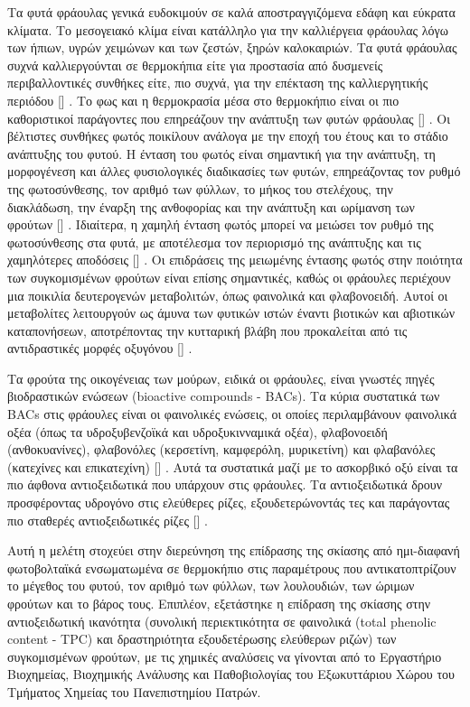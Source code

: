 \documentclass[12pt, a4paper]{report} %
\DeclareRobustCommand{\lcitep}[1]{%
  \english{[\cite{#1}]}%
}
\newcommand{\english}{\foreignlanguage{english}}
\begin{document}
Τα φυτά φράουλας γενικά ευδοκιμούν σε καλά αποστραγγιζόμενα εδάφη και εύκρατα κλίματα. Το μεσογειακό κλίμα είναι 
κατάλληλο για την καλλιέργεια φράουλας λόγω των ήπιων, υγρών χειμώνων και των ζεστών, ξηρών καλοκαιριών. 
Τα φυτά φράουλας συχνά καλλιεργούνται σε θερμοκήπια είτε για προστασία από δυσμενείς περιβαλλοντικές συνθήκες 
είτε, πιο συχνά, για την επέκταση της καλλιεργητικής περιόδου \lcitep{strawberries_bib1}. Το φως και η θερμοκρασία 
μέσα στο θερμοκήπιο είναι οι πιο καθοριστικοί παράγοντες που επηρεάζουν την ανάπτυξη των φυτών φράουλας 
\lcitep{eisagwgi_alg_bib27}. Οι βέλτιστες συνθήκες φωτός ποικίλουν ανάλογα με την εποχή του έτους και το στάδιο 
ανάπτυξης του φυτού. Η ένταση του φωτός είναι σημαντική για την ανάπτυξη, τη μορφογένεση και άλλες φυσιολογικές 
διαδικασίες των φυτών, επηρεάζοντας τον ρυθμό της φωτοσύνθεσης, τον αριθμό των φύλλων, το μήκος του στελέχους, 
την διακλάδωση, την έναρξη της ανθοφορίας και την ανάπτυξη και ωρίμανση των φρούτων 
\lcitep{strawberries_bib3,strawberries_bib4,strawberries_bib5}. Ιδιαίτερα, η χαμηλή ένταση φωτός μπορεί να 
μειώσει τον ρυθμό της φωτοσύνθεσης στα φυτά, με αποτέλεσμα τον περιορισμό της ανάπτυξης και τις χαμηλότερες 
αποδόσεις \lcitep{strawberries_bib6}. Οι επιδράσεις της μειωμένης έντασης φωτός στην ποιότητα των συγκομισμένων 
φρούτων είναι επίσης σημαντικές, καθώς οι φράουλες περιέχουν μια ποικιλία δευτερογενών μεταβολιτών, όπως φαινολικά 
και φλαβονοειδή. Αυτοί οι μεταβολίτες λειτουργούν ως άμυνα των φυτικών ιστών έναντι βιοτικών και αβιοτικών 
καταπονήσεων, αποτρέποντας την κυτταρική βλάβη που προκαλείται από τις αντιδραστικές μορφές οξυγόνου \lcitep{strawberries_bib7}.

Τα φρούτα της οικογένειας των μούρων, ειδικά οι φράουλες, είναι γνωστές πηγές βιοδραστικών ενώσεων 
(\english{bioactive compounds - BACs}). Τα κύρια συστατικά των \english{BACs} στις φράουλες είναι οι 
φαινολικές ενώσεις, οι οποίες περιλαμβάνουν φαινολικά οξέα (όπως τα υδροξυβενζοϊκά και υδροξυκινναμικά οξέα), 
φλαβονοειδή (ανθοκυανίνες), φλαβονόλες (κερσετίνη, καμφερόλη, μυρικετίνη) και φλαβανόλες (κατεχίνες και επικατεχίνη) 
\lcitep{strawberries_bib8,strawberries_bib9}. Αυτά τα συστατικά μαζί με το ασκορβικό οξύ είναι τα πιο άφθονα 
αντιοξειδωτικά που υπάρχουν στις φράουλες. Τα αντιοξειδωτικά δρουν προσφέροντας υδρογόνο στις ελεύθερες ρίζες, 
εξουδετερώνοντάς τες και παράγοντας πιο σταθερές αντιοξειδωτικές ρίζες \lcitep{strawberries_bib10}.

Αυτή η μελέτη στοχεύει στην διερεύνηση της επίδρασης της σκίασης από ημι-διαφανή φωτοβολταϊκά ενσωματωμένα 
σε θερμοκήπιο στις παραμέτρους που αντικατοπτρίζουν το μέγεθος του φυτού, τον αριθμό των φύλλων, των λουλουδιών, 
των ώριμων φρούτων και το βάρος τους. Επιπλέον, εξετάστηκε η επίδραση της σκίασης στην αντιοξειδωτική ικανότητα 
(συνολική περιεκτικότητα σε φαινολικά (\english{total phenolic content - TPC}) και δραστηριότητα εξουδετέρωσης 
ελεύθερων ριζών) των συγκομισμένων φρούτων, με τις χημικές αναλύσεις να γίνονται από το Εργαστήριο Βιοχημείας, 
Βιοχημικής Ανάλυσης και Παθοβιολογίας του Εξωκυττάριου Χώρου του Τμήματος Χημείας του Πανεπιστημίου Πατρών.
\end{document}
